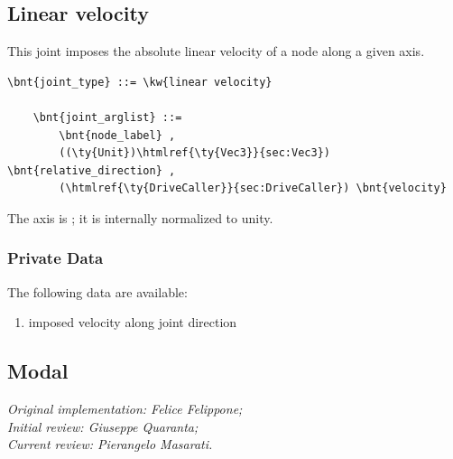 \subsection{Linear velocity}
This joint imposes the absolute linear velocity of a node
along a given axis.
\begin{Verbatim}[commandchars=\\\{\}]
    \bnt{joint_type} ::= \kw{linear velocity}

    \bnt{joint_arglist} ::=
        \bnt{node_label} ,
        ((\ty{Unit})\htmlref{\ty{Vec3}}{sec:Vec3}) \bnt{relative_direction} , 
        (\htmlref{\ty{DriveCaller}}{sec:DriveCaller}) \bnt{velocity}
\end{Verbatim}
The axis is ; it is internally normalized to unity.

\subsubsection{Private Data}
The following data are available:
\begin{enumerate}
\item {} imposed velocity along joint direction
\end{enumerate}

\subsection{Modal}\label{sec:EL:STRUCT:JOINT:MODAL}
\emph{
Original implementation: Felice Felippone; \\
Initial review: Giuseppe Quaranta; \\
Current review: Pierangelo Masarati.}

